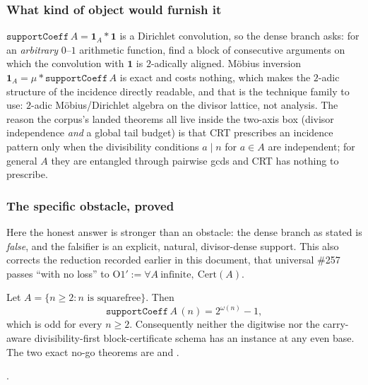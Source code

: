 \subsubsection*{What kind of object would furnish it}

$\mathtt{supportCoeff}\,A = \mathbf{1}_A * \mathbf{1}$ is a Dirichlet convolution, so the dense
branch asks: for an \emph{arbitrary} $0$--$1$ arithmetic function, find a block of consecutive
arguments on which the convolution with $\mathbf{1}$ is $2$-adically aligned. M\"obius inversion
$\mathbf{1}_A = \mu * \mathtt{supportCoeff}\,A$ is exact and costs nothing, which makes the
$2$-adic structure of the incidence directly readable, and that is the technique family to use:
$2$-adic M\"obius/Dirichlet algebra on the divisor lattice, not analysis. The reason the corpus's
landed theorems all live inside the two-axis box (divisor independence \emph{and} a global tail
budget) is that CRT prescribes an incidence pattern only when the divisibility conditions
$a\mid n$ for $a\in A$ are independent; for general $A$ they are entangled through pairwise gcds
and CRT has nothing to prescribe.

\subsubsection*{The specific obstacle, proved}

Here the honest answer is stronger than an obstacle: the dense branch as stated is \emph{false},
and the falsifier is an explicit, natural, divisor-dense support. This also corrects the reduction
recorded earlier in this document, that universal \#257 passes ``with no loss'' to
$\mathrm{O1}' := \forall A\ \text{infinite},\ \mathrm{Cert}(A)$.

\begin{prop}
\label{prop:squarefree}
Let $A=\{n\ge2:n\text{ is squarefree}\}$.  Then
\[
  \mathtt{supportCoeff}\,A\,(n)=2^{\omega(n)}-1,
\]
which is odd for every $n\ge2$.  Consequently neither the digitwise nor the
carry-aware divisibility-first block-certificate schema has an instance at
any even base.  The two exact no-go theorems are
and
.
\end{prop}
  .

